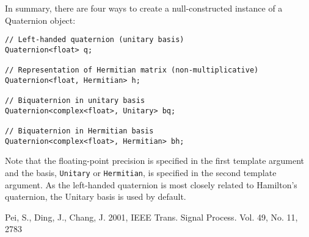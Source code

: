 \documentclass[12pt]{article}
\newcommand{\code}[1]{{\tt{#1}}}
\begin{document}
In summary, there are four ways to create a null-constructed instance
of a Quaternion object:
\begin{verbatim}
// Left-handed quaternion (unitary basis)
Quaternion<float> q;

// Representation of Hermitian matrix (non-multiplicative)
Quaternion<float, Hermitian> h;

// Biquaternion in unitary basis
Quaternion<complex<float>, Unitary> bq;

// Biquaternion in Hermitian basis
Quaternion<complex<float>, Hermitian> bh;
\end{verbatim}
Note that the floating-point precision is specified in the first
template argument and the basis, \code{Unitary} or \code{Hermitian},
is specified in the second template argument. As the left-handed
quaternion is most closely related to Hamilton's quaternion, the
Unitary basis is used by default.

\begin{thebibliography}{}

Pei, S., Ding, J., Chang, J. 2001,  IEEE Trans. Signal Process. Vol. 49,
No. 11, 2783

\end{thebibliography}
\end{document}
